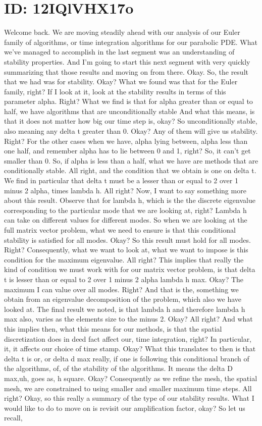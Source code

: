 \documentclass[10pt]{article}
\begin{document}
\section*{ID: 12IQlVHX17o}
Welcome back. We are moving steadily ahead with our analysis of our Euler family of algorithms, or time integration algorithms for our parabolic PDE. What we've managed to accomplish in the last segment was an understanding of stability properties. And I'm going to start this next segment with very quickly summarizing that those results and moving on from there. Okay. So, the result that we had was for stability.  Okay? What we found was that for the Euler family, right? If I look at it, look at the stability results in terms of this parameter alpha. Right? What we find is that for alpha greater than or equal to half, we have algorithms that are unconditionally stable And what this means, is that it does not matter how big our time step is, okay? So unconditionally stable, also meaning any delta t greater than 0. Okay? Any of them will give us stability. Right? For the other cases when we have, alpha lying between, alpha less than one half, and remember alpha has to lie between 0 and 1, right? So, it can't get smaller than 0. So, if alpha is less than a half, what we have are methods that are conditionally stable. All right, and the condition that we obtain is one on delta t. We find in particular that delta t must be a lesser than or equal to 2 over 1 minus 2 alpha, times lambda h. All right? Now, I want to say something more about this result. Observe that for lambda h, which is the the discrete eigenvalue corresponding to the particular mode that we are looking at, right? Lambda h can take on different values for different modes. So when we are looking at the full matrix vector problem, what we need to ensure is that this conditional stability is satisfied for all modes. Okay? So this result must hold for all modes. Right? Consequently, what we want to look at, what we want to impose is this condition for the maximum eigenvalue. All right? This implies that really the kind of condition we must work with for our matrix vector problem, is that delta t is lesser than or equal to 2 over 1 minus 2 alpha lambda h max. Okay? The maximum I can value over all modes. Right? And that is the, something we obtain from an eigenvalue decomposition of the problem, which also we have looked at. The final result we noted, is that lambda h and therefore lambda h max also, varies as the elements size to the minus 2. Okay? All right? And what this implies then, what this means for our methods, is that the spatial discretization does in deed fact affect our, time integration, right? In particular, it, it affects our choice of time stamp. Okay? What this translates to then is that delta t is or, or delta d max really, if one is following this conditional branch of the algorithms, of, of the stability of the algorithms. It means the delta D max,uh, goes as, h square. Okay? Consequently as we refine the mesh, the spatial mesh, we are constrained to using smaller and smaller maximum time steps. All right? Okay, so this really a summary of the type of our stability results. What I would like to do to move on is revisit our amplification factor, okay? So let us recall, 
\end{document}
